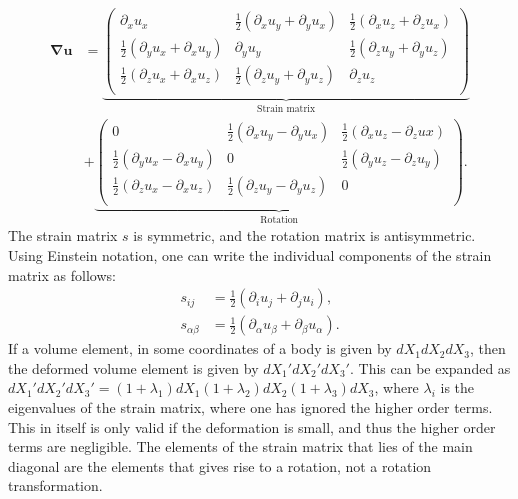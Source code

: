 \documentclass[a4paper]{article}
\newcommand{\grad}{\mathbf{\nabla}}
\begin{document}
\begin{align*}
    \grad{\mathbf{u}} &= \underbrace{\begin{pmatrix}
        \partial_x u_x &\frac{1}{2}\left(\partial_x u_y + \partial_y u_x\right) &\frac{1}{2}\left(\partial_xu_z + \partial_zu_x\right)\\
        \frac{1}{2}\left(\partial_y u_x + \partial_x u_y\right) & \partial_y u_y & \frac{1}{2}\left(\partial_zu_y + \partial_yu_z\right)\\
        \frac{1}{2}\left(\partial_zu_x + \partial_x u_z\right) & \frac{1}{2}\left(\partial_zu_y + \partial_yu_z\right) & \partial_z u_z\\        
    \end{pmatrix}}_{\text{Strain matrix}} \\
    &+ \underbrace{\begin{pmatrix}
        0 & \frac{1}{2}\left(\partial_xu_y - \partial_yu_x\right) & \frac{1}{2}\left(\partial_xu_z - \partial_zux\right)\\
        \frac{1}{2}\left(\partial_yu_x - \partial_xu_y\right) & 0 & \frac{1}{2}\left(\partial_yu_z - \partial_zu_y\right)\\
        \frac{1}{2}\left(\partial_zu_x - \partial_xu_z\right) & \frac{1}{2}\left(\partial_zu_y - \partial_yu_z\right) & 0\\
    \end{pmatrix}}_{\text{Rotation}}.
\end{align*}The strain matrix $s$ is symmetric, and the rotation matrix is antisymmetric. Using Einstein notation, one can write the individual components of the strain matrix as follows:
\begin{align*}
    s_{ij} &= \frac{1}{2}\left(\partial_i u_j + \partial_j u_i\right),\\
    s_{\alpha\beta} &= \frac{1}{2}\left(\partial_\alpha u_\beta + \partial_\beta u_\alpha\right).
\end{align*}If a volume element, in some coordinates of a body is given by $dX_1dX_2dX_3$, then the deformed volume element is given by $dX_1'dX_2'dX_3'$.
This can be expanded as $dX_1'dX_2'dX_3' = (1 + \lambda_1)dX_1(1 + \lambda_2)dX_2(1 + \lambda_3)dX_3$, where $\lambda_i$ is the eigenvalues of the strain matrix, where one has ignored the higher order terms.
This in itself is only valid if the deformation is small, and thus the higher order terms are negligible. The elements of the strain matrix that lies of the main diagonal are the elements that gives rise to a rotation, not a rotation transformation.
\end{document}
